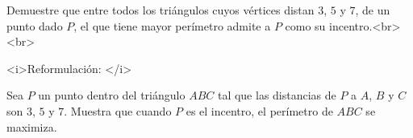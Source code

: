Demuestre que entre todos los triángulos cuyos vértices distan $3$, $5$ y $7$, de un punto dado $P$, el que tiene mayor perímetro admite a $P$ como su incentro.<br><br>

<i>Reformulación: </i>

Sea $P$ un punto dentro del triángulo $ABC$ tal que las distancias de $P$ a $A$, $B$ y $C$ son $3$, $5$ y $7$. Muestra que cuando $P$ es el incentro, el perímetro de $ABC$ se maximiza.